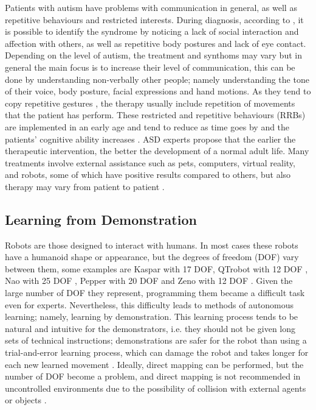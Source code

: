 \documentclass[thesis]{mas_proposal}
\begin{document}
		Patients with autism have problems with communication in general, as well as repetitive behaviours and restricted interests. During diagnosis, according to \cite{Brentani2013}, it is possible to identify the syndrome by noticing a lack of social interaction and affection with others, as well as repetitive body postures and lack of eye contact.  Depending on the level of autism, the treatment and synthoms may vary but in general the main focus is to increase their level of communication, this can be done by understanding non-verbally other people; namely understanding the tone of their voice, body posture, facial expressions and hand motions. As they tend to copy repetitive gestures \cite{Dautenhahn2004}, the therapy usually include repetition of movements that the patient has perform. These restricted and repetitive behaviours (RRBs) are implemented in an early age and tend to reduce as time goes by and the patients' cognitive ability increases \cite{Leekam2011}. ASD experts propose that the earlier the therapeutic intervention, the better the development of a normal adult life. Many treatments involve external assistance such as pets, computers, virtual reality, and robots, some of which have positive results compared to others, but also therapy may vary from patient to patient \cite{Scassellati2012}.
		
	\subsection{Learning from Demonstration}
	
		Robots are those designed to interact with humans. In most cases these robots have a humanoid shape or appearance, but the degrees of freedom (DOF) vary between them, some examples are Kaspar with 17 DOF\cite{Kaspar2023}, QTrobot with 12 DOF \cite{qtrobot_safety_manual}, Nao with 25 DOF \cite{softbankrobotics}, Pepper with 20 DOF \cite{softbankrobotics} and Zeno with 12 DOF \cite{Papakostas2021}. Given the large number of DOF they represent, programming them became a difficult task even for experts. Nevertheless, this difficulty leads to methods of autonomous learning; namely, learning by demonstration. This learning process tends to be natural and intuitive for the demonstrators, i.e. they should not be given long sets of technical instructions; demonstrations are safer for the robot than using a trial-and-error learning process, which can damage the robot and takes longer for each new learned movement \cite{Bandera2012}. Ideally, direct mapping can be performed, but the number of DOF become a problem, and direct mapping is not recommended in uncontrolled environments due to the possibility of collision with external agents or objects \cite{Bentivegna2004}.
	
\end{document}
